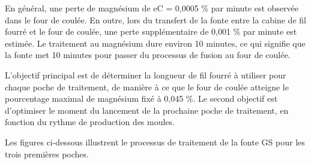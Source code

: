\documentclass[12pt]{article}
\begin{document}
En général, une perte de magnésium de eC = 0,0005 \% par minute est 
observée dans le four de coulée. En outre, lors du transfert de la fonte entre 
la cabine de fil fourré et le four de coulée, une perte supplémentaire 
de 0,001 \% par minute est estimée. Le traitement au magnésium dure 
environ 10 minutes, ce qui signifie que la fonte met 10 minutes pour 
passer du processus de fusion au four de coulée.

L'objectif principal est de déterminer la longueur de fil fourré à 
utiliser pour chaque poche de traitement, de manière à ce que le four 
de coulée atteigne le pourcentage maximal de magnésium fixé à 0,045 \%. 
Le second objectif est d'optimiser le moment du lancement de la prochaine 
poche de traitement, en fonction du rythme de production des moules.

Les figures ci-dessous illustrent le processus de traitement de la fonte 
GS pour les trois premières poches.


\end{document}
